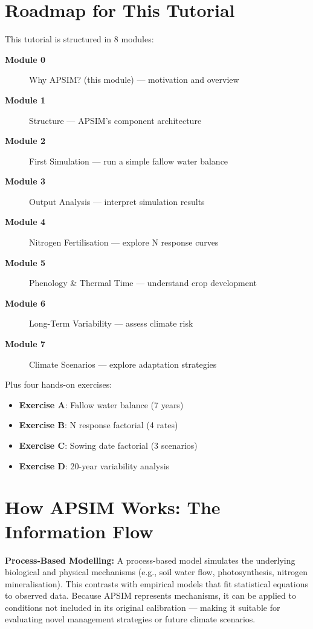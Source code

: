 \section{Roadmap for This Tutorial}

This tutorial is structured in 8 modules:

\begin{description}
  \item[\textbf{Module 0}] Why APSIM? (this module) — motivation and overview
  \item[\textbf{Module 1}] Structure — APSIM's component architecture
  \item[\textbf{Module 2}] First Simulation — run a simple fallow water balance
  \item[\textbf{Module 3}] Output Analysis — interpret simulation results
  \item[\textbf{Module 4}] Nitrogen Fertilisation — explore N response curves
  \item[\textbf{Module 5}] Phenology \& Thermal Time — understand crop development
  \item[\textbf{Module 6}] Long-Term Variability — assess climate risk
  \item[\textbf{Module 7}] Climate Scenarios — explore adaptation strategies
\end{description}

Plus four hands-on exercises:
\begin{itemize}
  \item \textbf{Exercise A}: Fallow water balance (7 years)
  \item \textbf{Exercise B}: N response factorial (4 rates)
  \item \textbf{Exercise C}: Sowing date factorial (3 scenarios)
  \item \textbf{Exercise D}: 20-year variability analysis
\end{itemize}

\section{How APSIM Works: The Information Flow}

\begin{keyconceptbox}
\textbf{Process-Based Modelling:} A process-based model simulates the underlying biological and physical mechanisms (e.g., soil water flow, photosynthesis, nitrogen mineralisation). This contrasts with empirical models that fit statistical equations to observed data. Because APSIM represents mechanisms, it can be applied to conditions not included in its original calibration --- making it suitable for evaluating novel management strategies or future climate scenarios.
\end{keyconceptbox}

